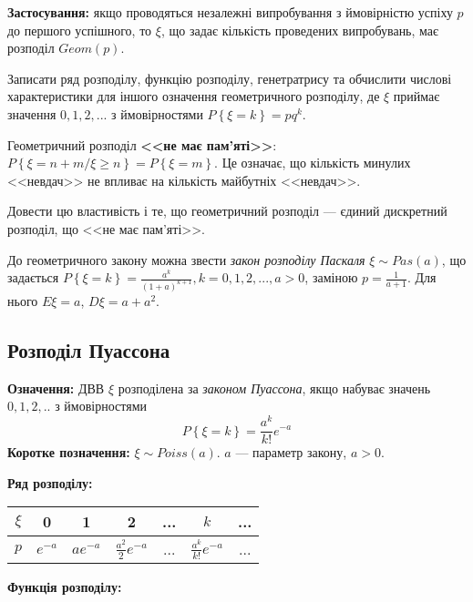\noindent\textbf{Застосування:} якщо проводяться незалежні випробування з ймовірністю успіху $p$ до першого успішного,
то $\xi$, що задає кількість проведених випробувань, має розподіл ${Geom}(p)$.

\begin{exercise}
    Записати ряд розподілу, функцію розподілу, генетратрису та обчислити
    числові характеристики для іншого означення геометричного розподілу, 
    де $\xi$ приймає значення $0,1,2,...$ з ймовірностями $P\left\{\xi = k\right\} = pq^k$.
\end{exercise}
Геометричний розподіл \textbf{<<не має пам'яті>>}: $P\left\{\xi = n+m / \xi \geq n\right\} = P\left\{\xi = m\right\}$.
Це означає, що кількість минулих <<невдач>> не впливає на кількість майбутніх <<невдач>>.
\begin{exercise}
    Довести цю властивість і те, що геометричний розподіл --- 
    єдиний дискретний розподіл, що <<не має пам'яті>>.
\end{exercise}
До геометричного закону можна звести \emph{закон розподілу Паскаля} $\xi \sim {Pas}(a)$,
що задається $P\left\{\xi = k\right\} = \frac{a^k}{(1+a)^{k+1}}, k = 0,1,2,..., a>0$,
заміною $p=\frac{1}{a+1}$. Для нього $E\xi = a$, $D\xi = a + a^2$.

\subsection{Розподіл Пуассона}
\noindent\textbf{Означення:}
    ДВВ $\xi$ розподілена за \emph{законом Пуассона}, 
    якщо набуває значень $0,1,2,..$ з ймовірностями \begin{equation}
        P\left\{\xi = k\right\} = \frac{a^k}{k!}e^{-a}
    \end{equation}
    \textbf{Коротке позначення:} $\xi \sim {Poiss}(a)$.
    $a$ --- параметр закону, $a > 0$.

\noindent\textbf{Ряд розподілу:}

\begin{tabular}{c|c|c|c|c|c|c}
    $\xi$ & 0 & 1 & 2 & ... & $k$ & ... \\
    \hline
    $p$ & $e^{-a}$ & $ae^{-a}$ & $\frac{a^2}{2}e^{-a}$ & ... & $\frac{a^k}{k!}e^{-a}$ & ...
\end{tabular}

\noindent\textbf{Функція розподілу:}

